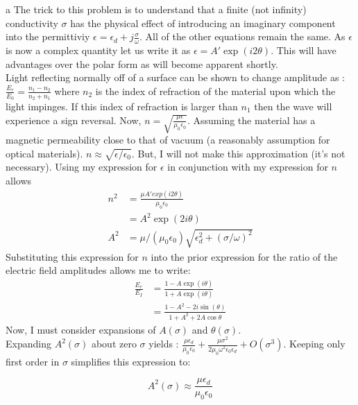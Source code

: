 \begin{homeworkProblem}
\begin{homeworkSection}{a}
The trick to this problem is to understand that a finite (not infinity) conductivity $\sigma$ has the physical effect of introducing an imaginary component into the permittiviy $\epsilon = \epsilon_{d} + j\frac{\sigma}{\omega}$. All of the other equations remain the same. As $\epsilon$ is now a complex quantity let us write it as $\epsilon = A'\exp(i2\theta)$. This will have advantages over the polar form as will become apparent shortly.
\\

Light reflecting normally off of a surface can be shown to change amplitude as : $\frac{E_r}{E_0} = \frac{n_1-n_2}{n_2+n_1}$ where $n_2$ is the index of refraction of the material upon which the light impinges. If this index of refraction is larger than $n_1$ then the wave will experience a sign reversal. Now, $n = \sqrt{\frac{\mu \epsilon}{\mu_0 \epsilon_0}}$. Assuming the material has a magnetic permeability close to that of vacuum (a reasonably assumption for optical materials). $n \approx \sqrt{\epsilon/\epsilon_0}$. But, I will not make this approximation (it's not necessary). Using my expression for $\epsilon$ in conjunction with my expression for $n$ allows 
\begin{align*}
n^2 &= \frac{\mu A' exp(i2\theta)}{\mu_0\epsilon_0} \\ &= A^2\exp(2i\theta) \\
A^2 &= \mu/(\mu_0 \epsilon_0)\sqrt{\epsilon_{d}^2+(\sigma/\omega)^2}
\end{align*}
Substituting this expression for $n$ into the prior expression for the ratio of the electric field amplitudes allows me to write: 
\begin{align*}
\frac{E_r}{E_I} &= \frac{1-A\exp(i\theta)}{1+A\exp(i\theta)} \\
&= \frac{1-A^2-2i\sin(\theta)}{1+A^2+2A\cos\theta}
\end{align*}
Now, I must consider expansions of $A(\sigma)$ and $\theta(\sigma)$.
\\

Expanding $A^2(\sigma)$ about zero $\sigma$ yields : $\frac{\mu  \epsilon _d}{\mu _0 \epsilon _0}+\frac{\mu  \sigma ^2}{2 \mu _0 \omega ^2 \epsilon _0 \epsilon
   _d}+O\left(\sigma ^3\right)$. Keeping only first order in $\sigma$ simplifies this expression to:
	
	\[ A^2(\sigma) \approx \frac{\mu \epsilon_d}{\mu_0 \epsilon_0} \]
\\


\end{homeworkSection}
\end{homeworkProblem}
